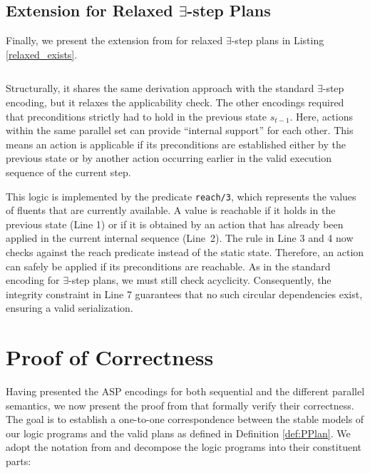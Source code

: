 \documentclass[
     11pt,                    %
     a4paper,             %
     BCOR=10mm,     %
     DIV=14,                 %
     listof=totoc,                    %
     bibliography=totoc,       %
     index=totoc,              %
     parskip            %
     twoside,
     headsepline
     ]{scrreprt}
\theoremstyle{definition}
\theoremstyle{definition}
\theoremstyle{remark}
\theoremstyle{bfnote}
\begin{document}
\subsection{Extension for Relaxed \texorpdfstring{$\boldsymbol{\exists}$}{exists}-step Plans}

Finally, we present the extension from \textcite{DIMOPOULOS_2019} for relaxed $\exists$-step plans in Listing \ref{relaxed_exists}.

\begin{listing}[H]
  \caption{Extension of Listing \ref{core} for Encoding Relaxed $\exists$-step Plans}
  \inputminted[frame=single,framesep=2mm,baselinestretch=1.2,linenos, firstline=2, firstnumber=1]{prolog}{encodings/EX_relaxed.lp}
  \label{relaxed_exists}
\end{listing}

Structurally, it shares the same derivation approach with the standard $\exists$-step encoding, but it relaxes the applicability check.
The other encodings required that preconditions strictly had to hold in the previous state $s_{t-1}$. 
Here, actions within the same parallel set can provide \enquote{internal support} for each other. 
This means an action is applicable if its preconditions are established either by the previous state or by another action occurring earlier in the valid execution sequence of the current step.

This logic is implemented by the predicate \texttt{reach/3}, which represents the values of fluents that are currently available. A value is reachable if it holds in the previous state (Line 1) or if it is obtained by an action that has already been applied in the current internal sequence (Line~2).
The rule in Line 3 and 4 now checks against the reach predicate instead of the static state. Therefore, an action can safely be applied if its preconditions are reachable.
As in the standard encoding for $\exists$-step plans, we must still check acyclicity. Consequently, the integrity constraint in Line 7 guarantees that no such circular dependencies exist, ensuring a valid serialization.

\section{Proof of Correctness}
Having presented the ASP encodings for both sequential and the different parallel semantics, we now present the proof from \textcite{DIMOPOULOS_2019} that formally verify their correctness.
The goal is to establish a one-to-one correspondence between the stable models of our logic programs and the valid plans as defined in Definition \ref{def:PPlan}.
We adopt the notation from \textcite{DIMOPOULOS_2019} and decompose the logic programs into their constituent parts: 
\end{document}
